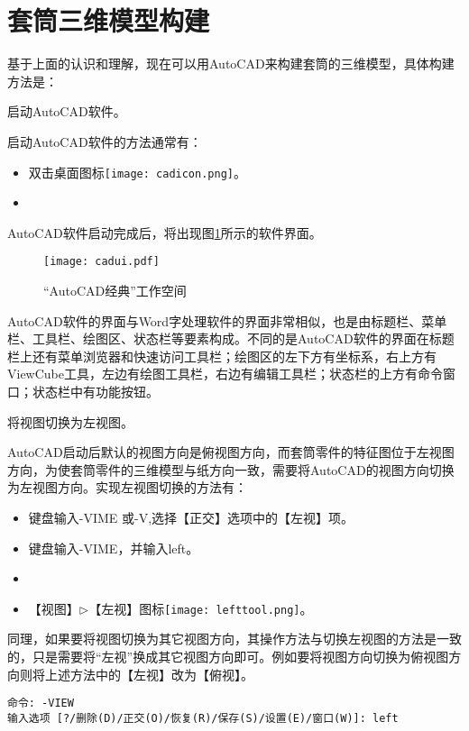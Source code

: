 \section{套筒三维模型构建}\label{sec:taotongjianmo}
基于上面的认识和理解，现在可以用AutoCAD来构建套筒的三维模型，具体构建方法是：
\begin{procedure}

\item 启动AutoCAD软件。

启动AutoCAD软件的方法通常有：
\begin{itemize}
\item 双击桌面图标\texttt{[image: cadicon.png]}。
\item {}
\end{itemize}

AutoCAD软件启动完成后，将出现图\ref{fig:cadui}所示的软件界面。
\begin{figure}[htbp]
\centering
\texttt{[image: cadui.pdf]}
\caption{“AutoCAD经典”工作空间}\label{fig:cadui}
\end{figure}

AutoCAD软件的界面与Word字处理软件的界面非常相似，也是由标题栏、菜单栏、工具栏、绘图区、状态栏等要素构成。不同的是AutoCAD软件的界面在标题栏上还有菜单浏览器和快速访问工具栏；绘图区的左下方有坐标系，右上方有ViewCube工具，左边有绘图工具栏，右边有编辑工具栏；状态栏的上方有命令窗口；状态栏中有功能按钮。

\item 将视图切换为左视图。

AutoCAD启动后默认的视图方向是俯视图方向，而套筒零件的特征图位于左视图方向，为使套筒零件的三维模型与纸方向一致，需要将AutoCAD的视图方向切换为左视图方向。实现左视图切换的方法有：
\begin{itemize}
\item 键盘输入-VIME 或-V,选择【正交】选项中的【左视】项。
\item 键盘输入-VIME，并输入left。
\item {}
\item 【视图】$\triangleright$【左视】图标\texttt{[image: lefttool.png]}。
\end{itemize}

同理，如果要将视图切换为其它视图方向，其操作方法与切换左视图的方法是一致的，只是需要将“左视”换成其它视图方向即可。例如要将视图方向切换为俯视图方向则将上述方法中的【左视】改为【俯视】。

\begin{lstlisting}
命令: -VIEW
输入选项 [?/删除(D)/正交(O)/恢复(R)/保存(S)/设置(E)/窗口(W)]: left
\end{lstlisting}


\end{procedure}

